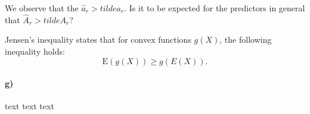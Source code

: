 We observe that the $\hat{a}_r > tilde{a}_r$. 
Is it to be expected for the predictors in general that $\hat{A}_r > tilde{A}_r$? 

Jensen's inequality states that for convex functions $g(X)$, the following inequality holds: 
\begin{equation*}
    \text{E}(g(X)) \geq g(E(X)).
\end{equation*}


\paragraph{g)}
text text text
